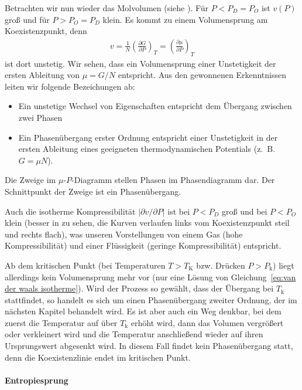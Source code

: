 Betrachten wir nun wieder das Molvolumen (siehe ). Für $P<P_D=P_O$ ist $v(P)$ groß und für $P>P_O=P_D$ klein. Es kommt zu einem Volumensprung am Koexistenzpunkt, denn
\begin{align*}
    v=\frac{1}{N}\left( \frac{\partial G}{\partial P} \right)_T =\left( \frac{\partial \mu}{\partial P} \right)_T
\end{align*}
ist dort unstetig. Wir sehen, dass ein Volumensprung einer Unstetigkeit der ersten Ableitung von $\mu=G/N$ entspricht. Aus den gewonnenen Erkenntnissen leiten wir folgende Bezeichungen ab:
\begin{itemize}
    \item Ein unstetige Wechsel von Eigenschaften entspricht dem Übergang zwischen zwei Phasen
    \item Ein Phasenübergang erster Ordnung entspricht einer Unstetigkeit in der ersten Ableitung eines geeigneten thermodynamischen Potentials (z.~B. $G=\mu N$).
\end{itemize}

Die Zweige im $\mu$-$P$-Diagramm stellen Phasen im Phasendiagramm dar. Der Schnittpunkt der Zweige ist ein Phasenübergang.

Auch die isotherme Kompressibilität $|\partial v/\partial P|$ ist bei $P<P_D$ groß und bei $P<P_O$ klein (besser in  zu sehen, die Kurven verlaufen links vom Koexistenzpunkt steil und rechts flach), was unseren Vorstellungen von einem Gas (hohe Kompressibilität) und einer Flüssigkeit (geringe Kompressibilität) entspricht.


Ab dem kritischen Punkt (bei Temperaturen $T>T_\mathrm{K}$ bzw. Drücken $P>P_\mathrm{k}$) liegt allerdings kein Volumensprung mehr vor (nur eine Lösung von Gleichung~\eqref{eq:van der waals isotherme}). Wird der Prozess so gewählt, dass der Übergang bei $T_\mathrm{k}$ stattfindet, so handelt es sich um einen Phasenübergang zweiter Ordnung, der im nächsten Kapitel behandelt wird. Es ist aber auch ein Weg denkbar, bei dem zuerst die Temperatur auf über $T_\mathrm{k}$ erhöht wird, dann das Volumen vergrößert oder verkleinert wird und die Temperatur anschließend wieder auf ihren Ursprungswert abgesenkt wird. In diesem Fall findet kein Phasenübergang statt, denn die Koexistenzlinie endet im kritischen Punkt.


\paragraph*{Entropiesprung}


